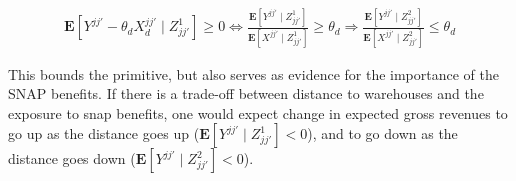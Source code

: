 \documentclass[11pt]{article}
\begin{document}
      \begin{align*}
          \mathbf{E}[Y^{jj'}-\theta_d X_d^{jj'} \mid Z^{1}_{jj'}] \geq 0 \iff \frac{\mathbf{E}[Y^{jj'}\mid Z^{1}_{jj'}]}{\mathbf{E}[X^{jj'}\mid Z^{1}_{jj'}]}\geq \theta_d  \Rightarrow \frac{\mathbf{E}[Y^{jj'}\mid Z^{2}_{jj'}]}{\mathbf{E}[X^{jj'}\mid Z^{2}_{jj'}]}\leq \theta_d 
      \end{align*}

     This bounds the primitive, but also serves as evidence for the importance of the SNAP benefits. If there is a trade-off between distance to warehouses and the exposure to snap benefits, one would expect change in expected gross revenues  to go up as the distance goes up ($\mathbf{E}[Y^{jj'} \mid Z^{1}_{jj'}]<0$), and to go down as the distance goes down  ($\mathbf{E}[Y^{jj'} \mid Z^{2}_{jj'}]<0$). 
      










\end{document}
